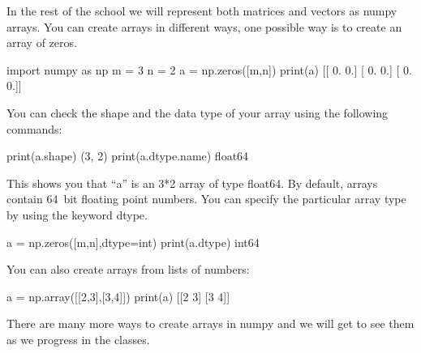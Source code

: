 \begin{exercise}
In the rest of the school we will represent both matrices and vectors as numpy arrays. You can create arrays in different ways, one possible way is to create an array of zeros.
\begin{python}
import numpy as np
m = 3
n = 2
a = np.zeros([m,n])
print(a)
[[ 0.  0.]
 [ 0.  0.]
 [ 0.  0.]]
\end{python}

\noindent You can check the shape and the data type of your array using the following commands:
\begin{python}
print(a.shape)
(3, 2)
print(a.dtype.name)
float64
\end{python}
This shows you that ``a'' is an 3*2 array of type float64. By default, arrays contain 64~bit\footnotemark{} floating point numbers. You can specify the particular array type by using the keyword dtype.

\begin{python}
a = np.zeros([m,n],dtype=int)
print(a.dtype)
int64
\end{python}

\smallskip

\noindent You can also create arrays from lists of numbers:
\begin{python}
a = np.array([[2,3],[3,4]])
print(a)
[[2 3]
 [3 4]]
\end{python}

There are many more ways to create arrays in numpy and we will get to see them as we progress in the classes.

\end{exercise}

